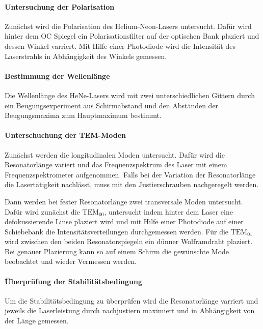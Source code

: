 \paragraph{ Untersuchung der Polarisation}
Zunächst wird die Polarisation des Helium-Neon-Lasers
untersucht. Dafür wird hinter dem OC Spiegel ein
Polarisationsfilter auf der optischen Bank
plaziert und dessen Winkel varriert. Mit Hilfe einer Photodiode wird
die Intensität des Laserstrahls in Abhängigkeit des Winkels gemessen.

\paragraph{Bestimmung der Wellenlänge}
Die Wellenlänge des HeNe-Lasers wird mit zwei unterschiedlichen
Gittern durch ein Beugungsexperiment aus Schirmabstand
und den Abständen der Beugungsmaxima zum Hauptmaximum bestimmt.

\paragraph{Unterschuchung der TEM-Moden}
Zunächst werden die longitudinalen Moden untersucht. Dafür
wird die Resonatorlänge variert und das Frequenzspektrum des Laser
mit einem Frequenzspektrometer aufgenommen.
Falls bei der Variation der Resonatorlänge die Lasertätigkeit
nachlässt, muss mit den Justierschrauben nachgeregelt werden.

Dann werden bei fester Resonatorlänge zwei transversale Moden untersucht.
Dafür wird zunächst die $\text{TEM}_{00}$, untersucht indem hinter dem
Laser eine defokussierende Linse plaziert wird und mit Hilfe einer
Photodiode auf einer Schiebebank die Intensitätsverteilungen
durchgemessen werden.
Für die $\text{TEM}_{01}$ wird zwischen den beiden Resonatorspiegeln
ein dünner Wolframdraht plaziert. Bei genauer Plazierung kann so auf
einem Schirm die gewünschte Mode beobachtet
und wieder Vermessen werden.


\paragraph{Überprüfung der Stabilitätsbedingung}
Um die Stabilitätsbedingung zu überprüfen
wird die Resonatorlänge varriert und jeweils
die Laserleistung durch nachjustiern maximiert und in Abhängigkeit von
der Länge gemessen.
